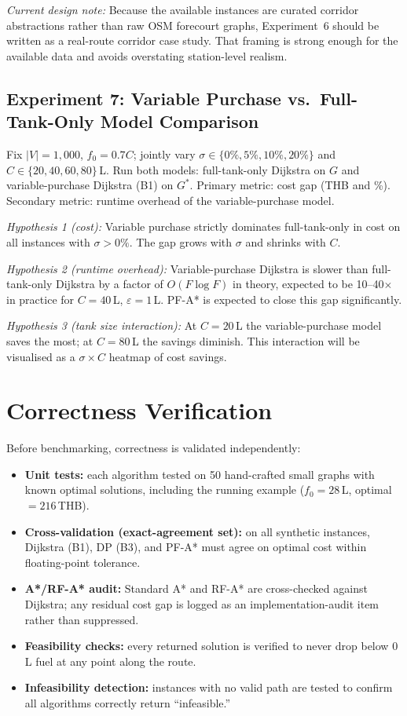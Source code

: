 \textit{Current design note:} Because the available instances are curated corridor abstractions
rather than raw OSM forecourt graphs, Experiment~6 should be written as a real-route corridor
case study.
That framing is strong enough for the available data and avoids overstating station-level
realism.

\subsection{Experiment 7: Variable Purchase vs.\ Full-Tank-Only Model Comparison}

Fix $|V|=1{,}000$, $f_0=0.7C$; jointly vary $\sigma \in \{0\%,5\%,10\%,20\%\}$ and
$C \in \{20,40,60,80\}$\,L.
Run both models: full-tank-only Dijkstra on $G$ and variable-purchase Dijkstra (B1) on
$G^{*}$.
Primary metric: cost gap (THB and \%).
Secondary metric: runtime overhead of the variable-purchase model.

\textit{Hypothesis 1 (cost):} Variable purchase strictly dominates full-tank-only in cost on
all instances with $\sigma > 0\%$.
The gap grows with $\sigma$ and shrinks with $C$.

\textit{Hypothesis 2 (runtime overhead):} Variable-purchase Dijkstra is slower than
full-tank-only Dijkstra by a factor of $O(F\log F)$ in theory, expected to be 10--40$\times$
in practice for $C=40$\,L, $\varepsilon=1$\,L.
PF-A* is expected to close this gap significantly.

\textit{Hypothesis 3 (tank size interaction):} At $C=20$\,L the variable-purchase model
saves the most; at $C=80$\,L the savings diminish.
This interaction will be visualised as a $\sigma \times C$ heatmap of cost savings.

\section{Correctness Verification}

Before benchmarking, correctness is validated independently:
\begin{itemize}
    \item \textbf{Unit tests:} each algorithm tested on 50 hand-crafted small graphs with
          known optimal solutions, including the running example
          ($f_0=28$\,L, optimal $=216$\,THB).
    \item \textbf{Cross-validation (exact-agreement set):} on all synthetic instances,
          Dijkstra (B1), DP (B3), and PF-A* must agree on optimal cost within
          floating-point tolerance.
    \item \textbf{A*/RF-A* audit:} Standard A* and RF-A* are cross-checked against
          Dijkstra; any residual cost gap is logged as an implementation-audit item
          rather than suppressed.
    \item \textbf{Feasibility checks:} every returned solution is verified to never drop below
          0\,L fuel at any point along the route.
    \item \textbf{Infeasibility detection:} instances with no valid path are tested to confirm
          all algorithms correctly return ``infeasible.''
\end{itemize}

